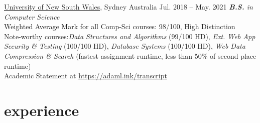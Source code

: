 \documentclass[hidelinks__VERSION__]{adamyi-cv}
\begin{document}
\begin{entrylist}


\entry
{\href{https://unsw.edu.au}{University of New South Wales}, Sydney Australia}
{Jul. 2018 -- May. 2021}
{\emph{\textbf{B.S.} in Computer Science}\\
Weighted Average Mark for all Comp-Sci courses: 98/100, High Distinction\\
Note-worthy courses:\emph{Data Structures and Algorithms} (99/100 HD), \emph{Ext. Web App Security \& Testing} (100/100 HD), \emph{Database Systems} (100/100 HD), \emph{Web Data Compression \& Search} (fastest assignment runtime, less than 50\% of second place runtime)\\
Academic Statement at \href{https://adaml.ink/transcript}{https://adaml.ink/transcript}
}

\end{entrylist}


\section{experience}
\end{document}
